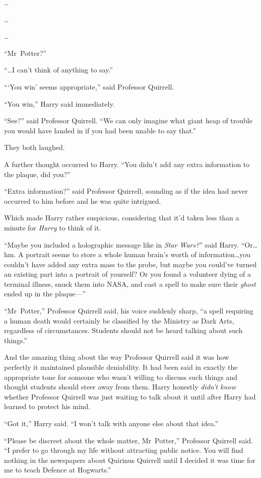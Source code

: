 …

…

…

“Mr~Potter?”

“…I can’t think of anything to say.”

“‘You win’ seems appropriate,” said Professor Quirrell.

“You win,” Harry said immediately.

“See?” said Professor Quirrell. “We can only imagine what giant heap of trouble you would have landed in if you had been unable to say that.”

They both laughed.

A further thought occurred to Harry. “You didn’t add any extra information to the plaque, did you?”

“Extra information?” said Professor Quirrell, sounding as if the idea had never occurred to him before and he was quite intrigued.

Which made Harry rather suspicious, considering that it’d taken less than a minute for \emph{Harry} to think of it.

“Maybe you included a holographic message like in \emph{Star Wars?}” said Harry. “Or…hm. A portrait seems to store a whole human brain’s worth of information…you couldn’t have added any extra mass to the probe, but maybe you could’ve turned an existing part into a portrait of yourself? Or you found a volunteer dying of a terminal illness, snuck them into NASA, and cast a spell to make sure their \emph{ghost} ended up in the plaque—”

“Mr~Potter,” Professor Quirrell said, his voice suddenly sharp, “a spell requiring a human death would certainly be classified by the Ministry as Dark Arts, regardless of circumstances. Students should not be heard talking about such things.”

And the amazing thing about the way Professor Quirrell said it was how perfectly it maintained plausible deniability. It had been said in exactly the appropriate tone for someone who wasn’t willing to discuss such things and thought students should steer away from them. Harry honestly \emph{didn’t know} whether Professor Quirrell was just waiting to talk about it until after Harry had learned to protect his mind.

“Got it,” Harry said. “I won’t talk with anyone else about that idea.”

“Please be discreet about the whole matter, Mr~Potter,” Professor Quirrell said. “I prefer to go through my life without attracting public notice. You will find nothing in the newspapers about Quirinus Quirrell until I decided it was time for me to teach Defence at Hogwarts.”

